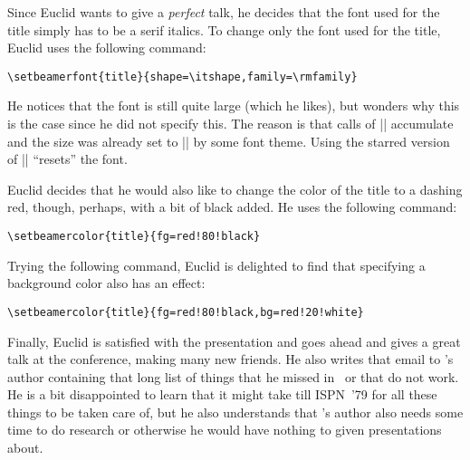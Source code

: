 Since Euclid wants to give a \emph{perfect} talk, he decides that the
font used for the title simply has to be a serif italics. To change
only the font used for the title, Euclid uses the following command:
\begin{verbatim}
\setbeamerfont{title}{shape=\itshape,family=\rmfamily}
\end{verbatim}
He notices that the font is still quite large (which he likes), but
wonders why this is the case since he did not specify this. The reason
is that calls of |\setbeamerfont| accumulate and the size was already
set to |\large| by some font theme. Using the starred version of
|\setbeamerfont| ``resets'' the font.

Euclid decides that he would also like to change the color of the
title to a dashing red, though, perhaps, with a bit of black added. He
uses the following command:
\begin{verbatim}
\setbeamercolor{title}{fg=red!80!black}
\end{verbatim}
Trying the following command, Euclid is delighted to find that
specifying a background color also has an effect:
\begin{verbatim}
\setbeamercolor{title}{fg=red!80!black,bg=red!20!white}
\end{verbatim}


Finally, Euclid is satisfied with the presentation and goes ahead and
gives a great talk at the conference, making many new friends. He also
writes that email to \beamer's author containing that long list of
things that he missed in \beamer\ or that do not work. He is a bit
disappointed to learn that it might take till ISPN~'79 for all these
things to be taken care of, but he also understands that \beamer's
author also needs some time to do research or otherwise he would have
nothing to given presentations about.

